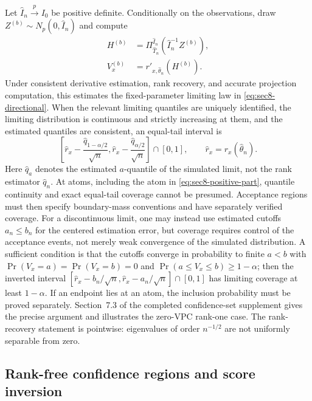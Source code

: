 Let $\widehat I_n\xrightarrow{p}I_0$ be positive definite.
Conditionally on the observations, draw
$Z^{(b)}\sim N_p(0,\widehat I_n)$ and compute
\begin{align}
H^{(b)}&=\Pi_{\widehat T_n}^{\widehat I_n}
(\widehat I_n^{-1}Z^{(b)}),\label{eq:sec8-sim-H}\\
V_x^{(b)}&=r'_{x,\widehat\theta_n}(H^{(b)}).
\label{eq:sec8-sim-V}
\end{align}
Under consistent derivative estimation, rank recovery, and accurate
projection computation, this estimates the fixed-parameter limiting law
in \eqref{eq:sec8-directional}. When the relevant limiting quantiles are uniquely identified, the
limiting distribution is continuous and strictly increasing at them,
and the estimated quantiles are consistent, an equal-tail interval is
\begin{equation}\label{eq:sec8-equal-tail}
\left[
\widehat r_x-\frac{\widehat q_{1-\alpha/2}}{\sqrt n},
\widehat r_x-\frac{\widehat q_{\alpha/2}}{\sqrt n}
\right]\cap[0,1],\qquad
\widehat r_x=r_x(\widehat\theta_n).
\end{equation}
Here $\widehat q_a$ denotes the estimated $a$-quantile of the
simulated limit, not the rank estimator $\widehat q_n$.
At atoms, including the atom in \eqref{eq:sec8-positive-part},
quantile continuity and exact equal-tail coverage cannot be presumed.
Acceptance regions must then specify boundary-mass conventions and
have separately verified coverage. For a discontinuous limit, one may
instead use estimated cutoffs
$a_n\le b_n$ for the centered estimation error, but coverage requires
control of the acceptance events, not merely weak convergence of the
simulated distribution. A sufficient condition is that the cutoffs
converge in probability to finite $a<b$ with
$\Pr(V_x=a)=\Pr(V_x=b)=0$ and
$\Pr(a\le V_x\le b)\ge1-\alpha$; then the inverted interval
$[\widehat r_x-b_n/\sqrt n,\widehat r_x-a_n/\sqrt n]
\cap[0,1]$ has limiting coverage at least $1-\alpha$.
If an endpoint lies at an atom, the inclusion probability must be
proved separately. Section~7.3 of the completed confidence-set supplement gives the precise
argument and illustrates the zero-VPC rank-one case.
The rank-recovery statement is pointwise: eigenvalues of order
$n^{-1/2}$ are not uniformly separable from zero.

\subsection{Rank-free confidence regions and score inversion}
\label{subsec:ci-rankfree}

